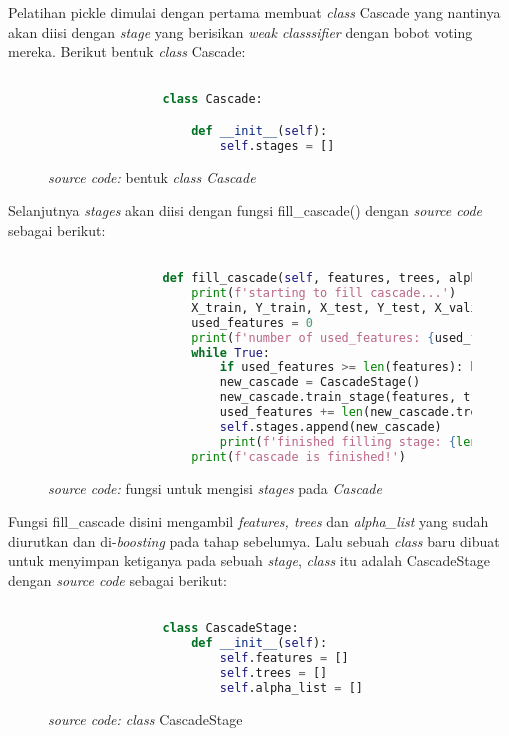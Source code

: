 		Pelatihan pickle dimulai dengan pertama membuat \textit{class} Cascade yang 
		nantinya akan diisi dengan \emph{stage} yang berisikan \emph{weak classsifier} 
		dengan bobot voting mereka. Berikut bentuk \textit{class} Cascade:

		\begin{figure}[H]
			\begin{lstlisting}[language=Python, basicstyle=\tiny]

				class Cascade:

					def __init__(self):
						self.stages = []

			\end{lstlisting}
			\caption{\emph{source code:} bentuk \textit{class Cascade}}
			\label{code: Cascade class}
		\end{figure}

		Selanjutnya \emph{stages} akan diisi dengan fungsi fill\_cascade() dengan 
		\textit{source code} sebagai berikut:

		\begin{figure}[H]
			\begin{lstlisting}[language=Python, basicstyle=\tiny]

				def fill_cascade(self, features, trees, alpha_list, splits):
					print(f'starting to fill cascade...')
					X_train, Y_train, X_test, Y_test, X_valid, Y_valid = splits
					used_features = 0
					print(f'number of used_features: {used_features}')
					while True:
						if used_features >= len(features): break
						new_cascade = CascadeStage()
						new_cascade.train_stage(features, trees, alpha_list, X_valid, Y_valid, used_features)
						used_features += len(new_cascade.trees) #check the total number of features used
						self.stages.append(new_cascade)
						print(f'finished filling stage: {len(self.stages)}')
					print(f'cascade is finished!')

			\end{lstlisting}
			\caption{\emph{source code:} fungsi untuk mengisi \emph{stages} pada 
			\emph{Cascade}}
			\label{code: fill cascade function}
		\end{figure}

		Fungsi fill\_cascade disini mengambil \textit{features, trees} dan \textit{alpha\_list} 
		yang sudah diurutkan dan di-\emph{boosting} pada tahap sebelumya. Lalu sebuah \textit{class} 
		baru dibuat untuk menyimpan ketiganya pada sebuah \emph{stage}, \textit{class} itu adalah 
		CascadeStage dengan \textit{source code} sebagai berikut:

		\begin{figure}[H]
			\begin{lstlisting}[language=Python, basicstyle=\tiny]

				class CascadeStage:
					def __init__(self):
						self.features = []
						self.trees = []
						self.alpha_list = []

			\end{lstlisting}
			\caption{\emph{source code: class} CascadeStage}
			\label{code: Cascade Class}
		\end{figure}

